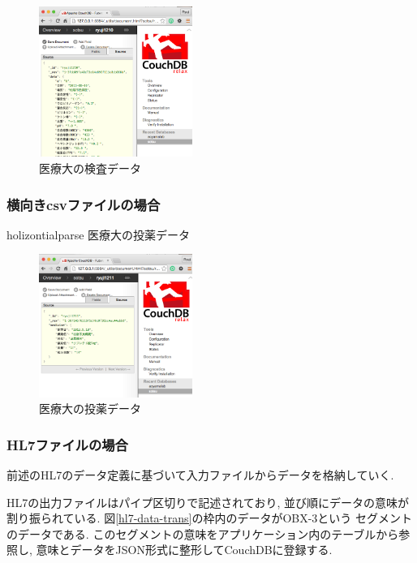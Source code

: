 			\begin{figure}[htbp]
					\includegraphics[width=5cm, bb=0 0 437 688]{./gazou/kensa-data.png}
				\caption{医療大の検査データ}
				\label{iryoudai-kensa-data}
			\end{figure}

		\subsubsection{横向きcsvファイルの場合}
			holizontialparse
			医療大の投薬データ
		\fi


			\begin{figure}[htbp]
					\includegraphics[width=5cm, bb=0 0 437 688]{./gazou/touyaku-data.png}
				\caption{医療大の投薬データ}
				\label{iryoudai-touyaku-data}
			\end{figure}

		\subsubsection{HL7ファイルの場合}
			前述のHL7のデータ定義に基づいて入力ファイルからデータを格納していく.

			HL7の出力ファイルはパイプ区切りで記述されており,
			並び順にデータの意味が割り振られている.
			図\ref{hl7-data-trans}の枠内のデータがOBX-3という
			セグメントのデータである.
			このセグメントの意味をアプリケーション内のテーブルから参照し,
			意味とデータをJSON形式に整形してCouchDBに登録する.



